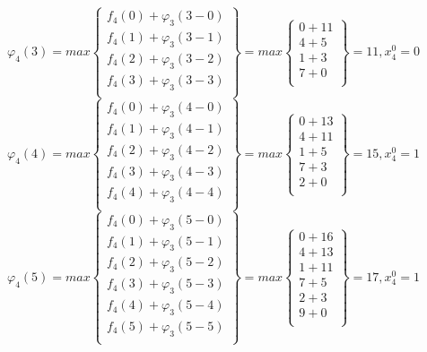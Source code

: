 $\varphi_4(3) = max \begin{Bmatrix}
    f_4(0) + \varphi_3(3 - 0) \\
    f_4(1) + \varphi_3(3 - 1) \\
    f_4(2) + \varphi_3(3 - 2) \\
    f_4(3) + \varphi_3(3 - 3) \\
\end{Bmatrix} = max \begin{Bmatrix}
    0 + 11 \\
    4 + 5 \\
    1 + 3 \\
    7 + 0 \\
\end{Bmatrix} = 11, x_4^0 = 0$\\

$\varphi_4(4) = max \begin{Bmatrix}
    f_4(0) + \varphi_3(4 - 0) \\
    f_4(1) + \varphi_3(4 - 1) \\
    f_4(2) + \varphi_3(4 - 2) \\
    f_4(3) + \varphi_3(4 - 3) \\
    f_4(4) + \varphi_3(4 - 4) \\
\end{Bmatrix} = max \begin{Bmatrix}
    0 + 13 \\
    4 + 11 \\
    1 + 5 \\
    7 + 3 \\
    2 + 0 \\
\end{Bmatrix} = 15, x_4^0 = 1$\\

$\varphi_4(5) = max \begin{Bmatrix}
    f_4(0) + \varphi_3(5 - 0) \\
    f_4(1) + \varphi_3(5 - 1) \\
    f_4(2) + \varphi_3(5 - 2) \\
    f_4(3) + \varphi_3(5 - 3) \\
    f_4(4) + \varphi_3(5 - 4) \\
    f_4(5) + \varphi_3(5 - 5) \\
\end{Bmatrix} = max \begin{Bmatrix}
    0 + 16 \\
    4 + 13 \\
    1 + 11 \\
    7 + 5 \\
    2 + 3 \\
    9 + 0 \\
\end{Bmatrix} = 17, x_4^0 = 1$\\

